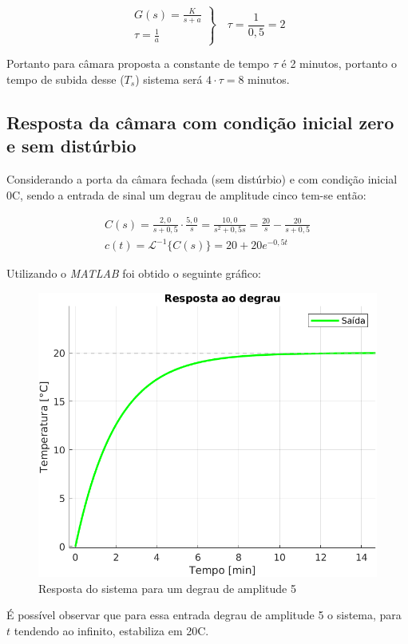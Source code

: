 \documentclass[a4paper,12pt]{article}
\begin{document}
		\begin{equation}
			\left.
			\begin{array}{c}
				\displaystyle G(s) = \frac{K}{s+a} \\[20pt]
				\displaystyle \tau = \frac{1}{a}
			\end{array}
			\right\}
			\quad \tau = \frac{1}{0,5} = 2
		\end{equation}
	
		Portanto para câmara proposta a constante de tempo $\tau$ é 2 minutos, portanto o tempo de subida desse ($T_s$) sistema será $4 \cdot \tau = 8$ minutos.
	
	\subsection{Resposta da câmara com condição inicial zero e sem distúrbio}
		Considerando a porta da câmara fechada (sem distúrbio) e com condição inicial 0\degree C, sendo a entrada de sinal um degrau de amplitude cinco tem-se então:
		

		\begin{gather}
			C(s) = \frac{2,0}{s+0,5} \cdot \frac{5,0}{s} = \frac{10,0}{s^2 + 0,5s} = \frac{20}{s} - \frac{20}{s+0,5} \\[20pt]
			c(t) = \mathcal{L}^{-1} \{ C(s) \} = 20 + 20e^{-0,5t}
		\end{gather}
	
		Utilizando o \textit{MATLAB} foi obtido o seguinte gráfico:
		
		\begin{figure}[H]
			\centering
			\includegraphics[width=0.5\linewidth]{images/respb.png}
			\caption{Resposta do sistema para um degrau de amplitude 5}
			\label{fig:resposta_b}
		\end{figure}
	
		É possível observar que para essa entrada degrau de amplitude 5 o sistema, para $t$ tendendo ao infinito, estabiliza em 20\degree C.
		
\end{document}

